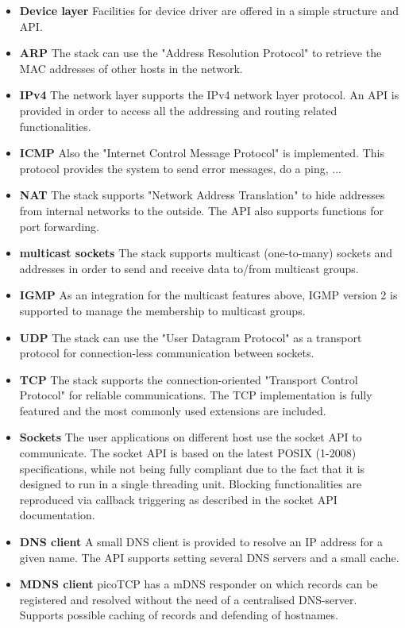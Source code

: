 \begin{itemize}
\item \textbf{Device layer} Facilities for device driver are offered in a simple
					structure and API.
\item \textbf{ARP} The stack can use the "Address Resolution Protocol" to retrieve
					the MAC addresses of other hosts in the network.
\item \textbf{IPv4} The network layer supports the IPv4 network layer
          protocol. An API is provided in order to access all the
          addressing and routing related functionalities.
\item \textbf{ICMP} Also the "Internet Control Message Protocol" is implemented. This
					protocol provides the system to send error messages, do a ping, ...
\item \textbf{NAT} The stack supports "Network Address Translation" to hide addresses
					from internal networks to the outside. The API also supports functions
					for port forwarding.
\item \textbf{multicast sockets} The stack supports multicast (one-to-many)
          sockets and addresses in order to send and receive data to/from
          multicast groups.
\item \textbf{IGMP} As an integration for the multicast features above, IGMP version 2
          is supported to manage the membership to multicast groups.
\item \textbf{UDP} The stack can use the "User Datagram Protocol" as a transport protocol
					for connection-less communication between sockets.
\item \textbf{TCP} The stack supports the connection-oriented "Transport Control Protocol"
					for reliable communications. The TCP implementation is fully
          featured and the most commonly used extensions are included.
\item \textbf{Sockets} The user applications on different host use the socket API to communicate.
					The socket API is based on the latest POSIX (1-2008)
          specifications, while not being fully compliant due to the fact
          that it is designed to run in a single threading unit. Blocking
          functionalities are reproduced via callback triggering as
          described in the socket API documentation.
\item \textbf{DNS client} A small DNS client is provided to resolve an IP address for a given name.
					The API supports setting several DNS servers and a small cache.
\item \textbf{MDNS client} picoTCP has a mDNS responder on which records can be registered and resolved without the need of a centralised DNS-server. Supports possible caching of records and defending of hostnames.

\end{itemize}
